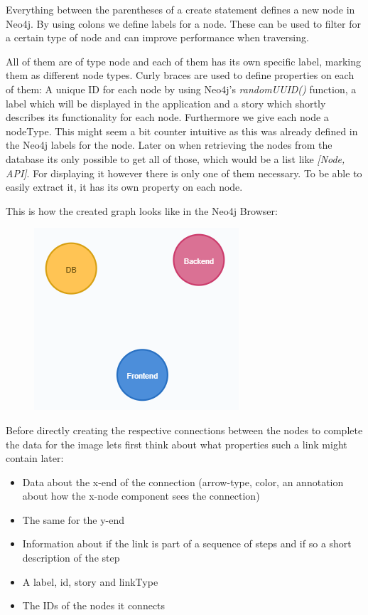 Everything between the parentheses of a create statement defines a new node in Neo4j. By using colons we define labels for a node. These can be used to filter for a certain type of node and can improve performance when traversing. 

All of them are of type node and each of them has its own specific label, marking them as different node types. Curly braces are used to define properties on each of them: A unique ID for each node by using Neo4j's \emph{randomUUID()} function, a label which will be displayed in the application and a story which shortly describes its functionality for each node. Furthermore we give each node a nodeType. This might seem a bit counter intuitive as this was already defined in the Neo4j labels for the node.
Later on when retrieving the nodes from the database its only possible to get all of those, which would be a list like \emph{[Node, API]}. For displaying it however there is only one of them necessary. To be able to easily extract it, it has its own property on each node.

\newpage
This is how the created graph looks like in the Neo4j Browser:
\begin{figure}[H]
\centering
\includegraphics[scale=1]{Bilder/BasicGraphNeo1.png}
\label{ex422}
\end{figure}

Before directly creating the respective connections between the nodes to complete the data for the image lets first think about what properties such a link might contain later:
\begin{itemize}
\item Data about the x-end of the connection (arrow-type, color, an annotation about how the x-node component sees the connection)
\item The same for the y-end
\item Information about if the link is part of a sequence of steps and if so a short description of the step
\item A label, id, story and linkType
\item The IDs of the nodes it connects
\end{itemize}

